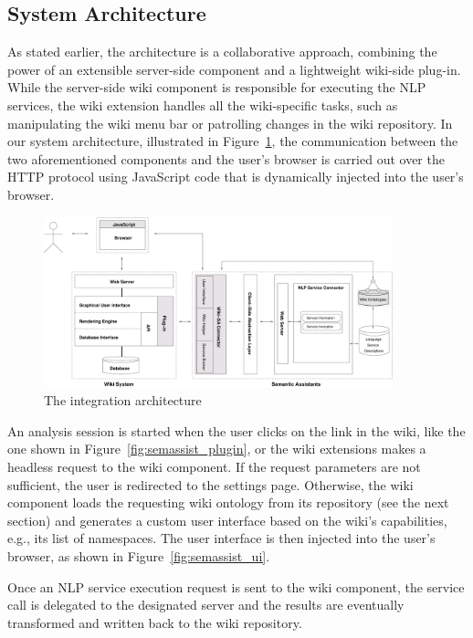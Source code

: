 \subsection{System Architecture}
As stated earlier, the \wikinlp architecture is a collaborative approach, combining the power of an extensible server-side component and a lightweight wiki-side plug-in. While the server-side wiki component is responsible for executing the NLP services, the wiki extension handles all the wiki-specific tasks, such as manipulating the wiki menu bar or patrolling changes in the wiki repository. In our system architecture, illustrated in Figure~\ref{fig:wikinlp_arch}, the communication between the two aforementioned components and the user's browser is carried out over the HTTP protocol using JavaScript code that is dynamically injected into the user's browser.

\begin{figure}
\centering
\includegraphics[width=0.9\textwidth]{pictures/wikinlp_arch}
\caption{The \wikinlp integration architecture}
\label{fig:wikinlp_arch}
\end{figure}

An analysis session is started when the user clicks on the \sa link in the wiki, like the one shown in Figure~\ref{fig:semassist_plugin}, or the wiki extensions makes a headless request to the wiki component. If the request parameters are not sufficient, the user is redirected to the settings page. Otherwise, the wiki component loads the requesting wiki ontology from its repository (see the next section) and generates a custom user interface based on the wiki's capabilities, e.g., its list of namespaces. The user interface is then injected into the user's browser, as shown in Figure~\ref{fig:semassist_ui}.

Once an NLP service execution request is sent to the wiki component, the service call is delegated to the designated \sa server and the results are eventually transformed and written back to the wiki repository.

